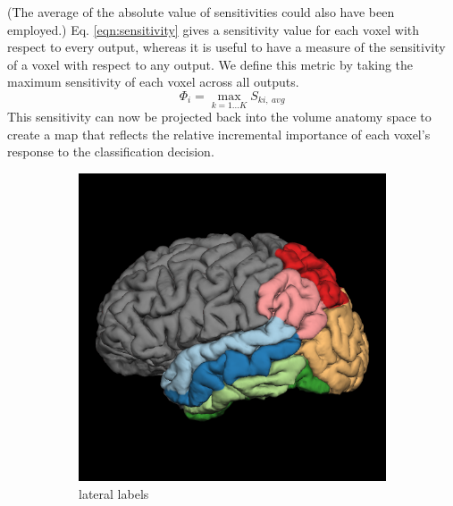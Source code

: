 \documentclass[preprint,5p,authoryear]{elsarticle}
\begin{document}
(The average of the absolute value of sensitivities could also have been employed.)
Eq. \ref{eqn:sensitivity} gives a sensitivity value for each voxel with respect to every output, whereas it is useful to have a measure of the sensitivity of a voxel with respect to any output.
We define this metric by taking the maximum sensitivity of each voxel across all outputs.
\begin{equation}
\Phi_{i} = \max_{k=1 \dots K}{S_{ki,~avg}}
\end{equation}
This sensitivity can now be projected back into the volume anatomy space to create a  map that reflects the relative incremental importance of each voxel's response to the classification decision.

\begin{figure}
\centering
\begin{subfigure}{0.3\textwidth}
\centering
\includegraphics[width=\textwidth]{figures/lh-lateral-labels}
\caption{lateral labels}
\label{fig:leteral-labels}
\end{subfigure}
\begin{subfigure}{0.3\textwidth}
\centering

\end{subfigure}
\end{figure}
\end{document}
